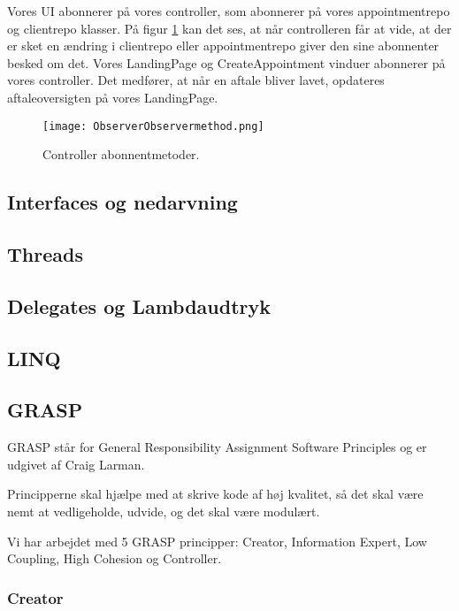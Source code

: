 Vores UI abonnerer på vores controller, som abonnerer på vores appointmentrepo og clientrepo klasser.
På figur \ref{fig:ObserverObservermethod} kan det ses, at når controlleren får at vide, at der er sket en ændring i clientrepo eller appointmentrepo giver den sine abonnenter besked om det.
Vores LandingPage og CreateAppointment vinduer abonnerer på vores controller.
Det medfører, at når en aftale bliver lavet, opdateres aftaleoversigten på vores LandingPage.

\begin{figure}[h]
    \caption{Controller abonnentmetoder.}
    \centering
        \texttt{[image: ObserverObservermethod.png]}
    \label{fig:ObserverObservermethod}
\end{figure}

\subsection{Interfaces og nedarvning}

\subsection{Threads}

\subsection{Delegates og Lambdaudtryk}

\subsection{LINQ}

\subsection{GRASP}
\label{grasp}
GRASP står for General Responsibility Assignment Software Principles og er udgivet af Craig Larman.\cite{larman}

Principperne skal hjælpe med at skrive kode af høj kvalitet, så det skal være nemt at vedligeholde, udvide, og det skal være modulært.

Vi har arbejdet med 5 GRASP principper: Creator, Information 
Expert, Low Coupling, High Cohesion og Controller.

\subsubsection{Creator}

